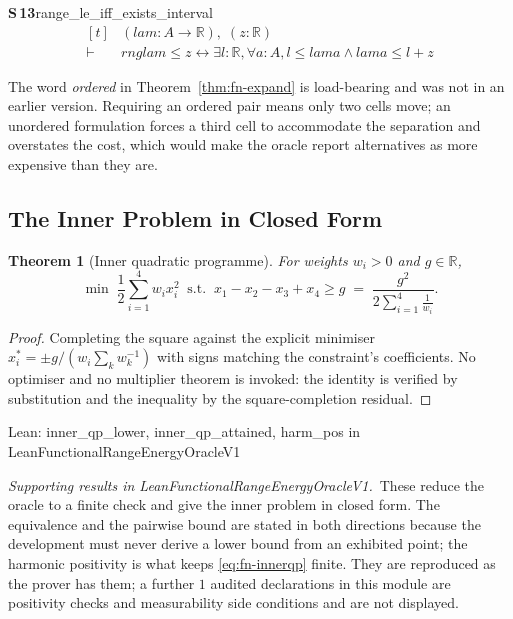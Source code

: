 \documentclass[conference]{IEEEtran}
\newtheorem{theorem}{Theorem}
\theoremstyle{definition}
\newcommand{\lean}[1]{\textsf{\footnotesize #1}}
\newcommand{\leanbox}[1]{%
  \par\vspace{2pt}\noindent
  {\footnotesize\textsf{Lean: #1}}\par\vspace{2pt}}
\begin{document}
\noindent\textbf{S\,13}\quad\lean{range\_le\_iff\_exists\_interval}
{\footnotesize\[ \begin{aligned}[t]
&(\mathit{lam} : \mathit{A} \to \mathbb{R} ),\; (\mathit{z} : \mathbb{R} )\\
\vdash\;&\mathit{rng} \mathit{lam} \leq \mathit{z} \leftrightarrow \exists \mathit{l} : \mathbb{R} , \forall \mathit{a} : \mathit{A}, \mathit{l} \leq \mathit{lam} \mathit{a} \wedge \mathit{lam} \mathit{a} \leq \mathit{l} + \mathit{z}
\end{aligned} \]}


The word \emph{ordered} in Theorem~\ref{thm:fn-expand} is load-bearing and was not in an earlier
version. Requiring an ordered pair means only two cells move; an unordered formulation forces
a third cell to accommodate the separation and overstates the cost, which would make the
oracle report alternatives as more expensive than they are.

\subsection{The Inner Problem in Closed Form}
\label{sec:fn-innerqp}

\begin{theorem}[Inner quadratic programme]
\label{thm:fn-innerqp}
For weights $w_{i}>0$ and $g\in\mathbb{R}$,
\begin{equation}
\min\;\frac{1}{2}\sum_{i=1}^{4}w_{i}x_{i}^{2}
\;\;\text{s.t.}\;\;x_{1}-x_{2}-x_{3}+x_{4}\geq g
\;=\;
\frac{g^{2}}{2\sum_{i=1}^{4}\frac{1}{w_{i}}} .
\label{eq:fn-innerqp}
\end{equation}
\end{theorem}

\begin{proof}
Completing the square against the explicit minimiser
$x_{i}^{*}=\pm g/(w_{i}\sum_{k}w_{k}^{-1})$ with signs matching the constraint's
coefficients. No optimiser and no multiplier theorem is invoked: the identity is verified by
substitution and the inequality by the square-completion residual.
\end{proof}

\leanbox{\lean{inner\_qp\_lower}, \lean{inner\_qp\_attained}, \lean{harm\_pos} in
\lean{LeanFunctionalRangeEnergyOracleV1}}

\noindent\emph{Supporting results in \lean{LeanFunctionalRangeEnergyOracleV1}.}~These reduce the oracle to a finite check and give the inner problem in closed form. The equivalence and the pairwise bound are stated in both directions because the development must never derive a lower bound from an exhibited point; the harmonic positivity is what keeps \eqref{eq:fn-innerqp} finite. They are reproduced as the prover has them; a further $1$ audited declarations in this module are positivity checks and measurability side conditions and are not displayed.
\end{document}
